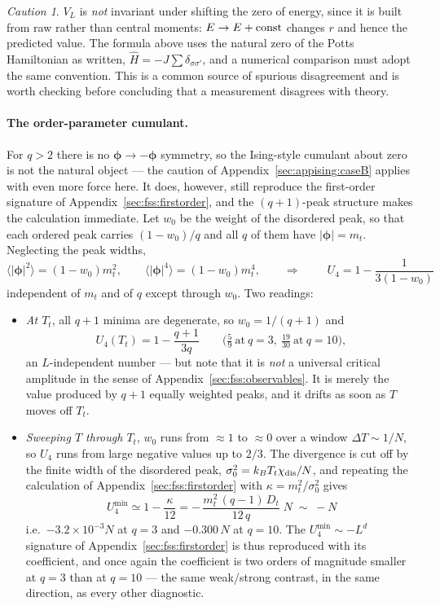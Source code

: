 \documentclass[10pt,a4paper]{article}
\theoremstyle{remark}
\newtheorem*{warning}{Caution}
\begin{document}
\begin{warning}
$V_L$ is \emph{not} invariant under shifting the zero of energy, since it is built
from raw rather than central moments: $E\to E+{\rm const}$ changes $r$ and hence
the predicted value. The formula above uses the natural zero of the Potts
Hamiltonian as written, $\hat H=-J\sum\delta_{\sigma\sigma'}$, and a numerical
comparison must adopt the same convention. This is a common source of spurious
disagreement and is worth checking before concluding that a measurement disagrees
with theory.
\end{warning}

\paragraph{The order-parameter cumulant.} For $q>2$ there is no
$\boldsymbol{\phi}\to-\boldsymbol{\phi}$ symmetry, so the Ising-style cumulant
about zero is not the natural object --- the caution of
Appendix~\ref{sec:appising:caseB} applies with even more force here. It does,
however, still reproduce the first-order signature of
Appendix~\ref{sec:fss:firstorder}, and the $(q{+}1)$-peak structure makes the
calculation immediate. Let $w_0$ be the weight of the disordered peak, so that
each ordered peak carries $(1-w_0)/q$ and all $q$ of them have
$|\boldsymbol{\phi}|=m_t$. Neglecting the peak widths,
\[
\langle|\boldsymbol{\phi}|^{2}\rangle=(1-w_0)m_t^{2},
\qquad
\langle|\boldsymbol{\phi}|^{4}\rangle=(1-w_0)m_t^{4},
\qquad\Longrightarrow\qquad
\;U_4=1-\frac{1}{3(1-w_0)}\
\]
independent of $m_t$ and of $q$ except through $w_0$. Two readings:
\begin{itemize}
\item \emph{At $T_t$}, all $q+1$ minima are degenerate, so $w_0=1/(q+1)$ and
\[
U_4(T_t)=1-\frac{q+1}{3q}
\qquad\big(\tfrac59\ \text{at}\ q=3,\ \tfrac{19}{30}\ \text{at}\ q=10\big),
\]
an $L$-independent number --- but note that it is \emph{not} a universal
critical amplitude in the sense of Appendix~\ref{sec:fss:observables}. It is
merely the value produced by $q+1$ equally weighted peaks, and it drifts as soon
as $T$ moves off $T_t$.
\item \emph{Sweeping $T$ through $T_t$}, $w_0$ runs from $\approx1$ to $\approx0$
over a window $\Delta T\sim1/N$, so $U_4$ runs from large negative values up to
$2/3$. The divergence is cut off by the finite width of the disordered peak,
$\sigma_0^{2}=k_BT_t\chi_{\rm dis}/N$, and repeating the calculation of
Appendix~\ref{sec:fss:firstorder} with $\kappa=m_t^{2}/\sigma_0^{2}$ gives
\[
\;
U_4^{\min}\simeq1-\frac{\kappa}{12}
=-\,\frac{m_t^{2}\,(q-1)\,D_t}{12\,q}\;N
\;\sim\;-N\
\]
i.e.\ $-3.2\times10^{-3}N$ at $q=3$ and $-0.300\,N$ at $q=10$. The
$U_4^{\min}\sim-L^{d}$ signature of Appendix~\ref{sec:fss:firstorder} is thus
reproduced with its coefficient, and once again the coefficient is two orders of
magnitude smaller at $q=3$ than at $q=10$ --- the same weak/strong contrast, in
the same direction, as every other diagnostic.
\end{itemize}
\end{document}

